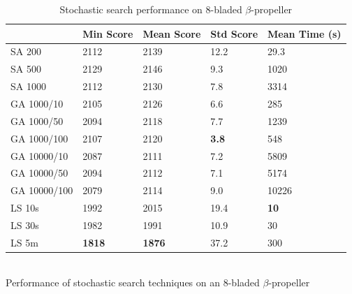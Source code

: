 \documentclass{acm_proc_article-sp}
\begin{document}
\begin{small}
\begin{table}[htb]
\centering
\caption{Stochastic search performance on 8-bladed $\beta$-propeller \label{ss-propeller}}
\begin{tabular}{lllll}
\hline
             & Min Score & Mean Score & Std Score & Mean Time (s) \\
\hline
SA 200       & 2112      & 2139       & 12.2      & 29.3      \\
\hline                                                        
SA 500       & 2129      & 2146       & 9.3       & 1020      \\
\hline                                                        
SA 1000      & 2112      & 2130       & 7.8      & 3314      \\
\hline                                                        
GA 1000/10   & 2105      & 2126       & 6.6      & 285      \\
\hline                                                        
GA 1000/50   & 2094      & 2118       & 7.7      & 1239      \\
\hline                                                        
GA 1000/100  & 2107      & 2120       & \textbf{3.8}      & 548      \\
\hline                                                        
GA 10000/10  & 2087      & 2111       & 7.2      & 5809      \\
\hline                                                        
GA 10000/50  & 2094      & 2112       & 7.1      & 5174      \\
\hline                                                        
GA 10000/100 & 2079      & 2114       & 9.0      & 10226      \\
\hline                                                        
LS 10s       & 1992     & 2015      & 19.4     & \textbf{10}    \\
\hline                                                        
LS 30s       & 1982     & 1991      & 10.9     & 30    \\
\hline                                                        
LS 5m        & \textbf{1818}     & \textbf{1876}      & 37.2     & 300    \\
\hline
\end{tabular}\\
{Performance of stochastic search techniques on an 8-bladed $\beta$-propeller
}
\end{table}
\end{small}
\end{document}
